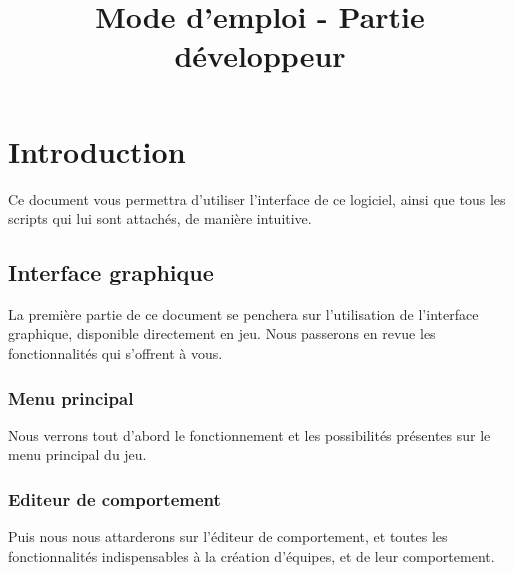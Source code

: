 \documentclass{article}
\title{Mode d'emploi - Partie développeur} %
\begin{document}
\maketitle %





\section{Introduction}

Ce document vous permettra d'utiliser l'interface de ce logiciel, ainsi que tous les scripts qui lui sont attachés, de manière intuitive.

\subsection{Interface graphique}
\label{Interface graphique}
La première partie de ce document se penchera sur l'utilisation de l'interface graphique, disponible directement en jeu. Nous passerons en revue les fonctionnalités qui s'offrent à vous.
\subsubsection{Menu principal}
\label{Menu principal}
Nous verrons tout d'abord le fonctionnement et les possibilités présentes sur le menu principal du jeu.
\subsubsection{Editeur de comportement}
\label{Editeur de comportement}
Puis nous nous attarderons sur l'éditeur de comportement, et toutes les fonctionnalités indispensables à la création d'équipes, et de leur comportement.
\end{document}
